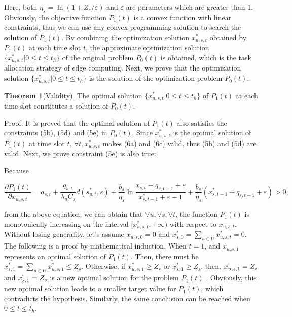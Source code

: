 \documentclass[journal,article,submit,pdftex,moreauthors]{Definitions/mdpi}
\begin{document}
Here, both  $\eta_s=\ln(1+Z_s/\varepsilon)$ and $\varepsilon$ are parameters which are greater than 1. Obviously, the objective function $P_1(t)$ is a convex function with linear constraints, thus we can use any convex programming solution to search the solution of $P_1(t)$. By combining the optimization solution $x_{u,s,t}^{*}$ obtained by $P_1(t)$ at each time slot $t$, the approximate optimization solution $\{x_{u,s,t}^{*}|0\le t \le t_h\}$ of the original problem $P_0(t)$ is obtained, which is the task allocation strategy of edge computing. Next, we prove that the optimization solution $\{x_{u,s,t}^{*}|0\le t \le t_h\}$ is the solution of the optimization problem $P_0(t)$.


\textbf{Theorem 1}(Validity). The optimal solution $\{x_{u,s,t}^{*}|0\le t \le t_h\}$ of $P_1(t)$ at each time slot constitutes a solution of $P_0(t)$.


Proof: It is proved that the optimal solution of $P_1(t)$ also satisfies the constraints (5b), (5d) and (5e) in $P_0(t)$. Since $x_{u,s,t}^{*}$ is the optimal solution of $P_1(t)$ at time slot $t$, $\forall t,x_{u,s,t}^{*}$ makes (6a) and (6c) valid, thus (5b) and (5d) are valid. Next,  we prove constraint (5e) is also true:


Because

\begin{equation*}
\frac{\partial P_1(t)}{\partial x_{u,s,t}}=a_{s,t}+\frac{q_{s,t}}{\lambda_u C_s}d(s_{u,t}^{*},s)+\frac{b_s}{\eta_s}\ln\frac{x_{s,t}+q_{s,t-1}+\varepsilon}{x_{s,t-1}^{*}+\varepsilon-1}+\frac{b_s}{\eta_s}(x_{s,t-1}^{*}+q_{s,t-1}+\varepsilon)>0,
\end{equation*}


from the above equation, we can obtain that $\forall u, \forall s, \forall t$, the function $P_1(t)$ is monotonically increasing on the interval $[x_{u,s,t}^{*},+\infty)$ with respect to $x_{u,s,t}$. Without losing generality, let's assume $x_{u,s,0}=0$ and $x_{s,0}^{*}=\sum_{u\in U}x_{u,s,t}^{*}=0$. The following is a proof by mathematical induction. When $ t=1$, and $x_{u,s,1}$ represents an optimal solution of $P_1(t)$. Then, there must be $x_{s,1}^{*}=\sum_{u\in U}x_{u,s,1}^{*}\le Z_s$. Otherwise, if $ x_{u,s,1}^{*}\ge Z_s $ or $ x_{s,1}^{*}\ge Z_s $,   then, $ x_{u,s,1}^{`}= Z_s $ and $ x_{s,1}^{`}= Z_s $ is a new optimal solution for the problem $P_1(t)$ . Obviously, this new optimal solution leads to a smaller target value for $P_1(t)$, which contradicts the hypothesis. Similarly, the same conclusion can be reached when $0\le t \le t_h$.
\end{document}
